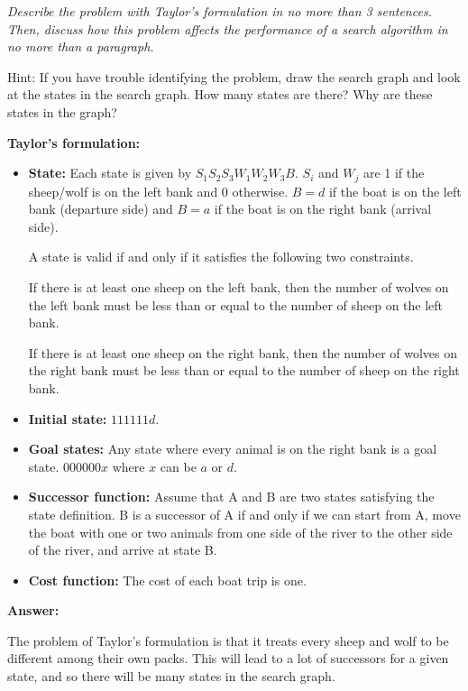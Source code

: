 \documentclass[12pt]{article}
\begin{document}
\begin{enumerate}[(a)]
{\em Describe the problem with Taylor's formulation in no more than 3 sentences. Then, discuss how this problem affects the performance of a search algorithm in no more than a paragraph.}

Hint: If you have trouble identifying the problem, draw the search graph and look at the states in the search graph. How many states are there? Why are these states in the graph?

\begin{example}

{\bf Taylor's formulation:}
\begin{itemize}
\item
{\bf State:} Each state is given by $S_1 S_2 S_3 W_1 W_2 W_3 B$. $S_i$ and $W_j$ are 1 if the sheep/wolf is on the left bank and 0 otherwise. $B = d$ if the boat is on the left bank (departure side) and $B = a$ if the boat is on the right bank (arrival side). 

A state is valid if and only if it satisfies the following two constraints.

If there is at least one sheep on the left bank, then the number of wolves on the left bank must be less than or equal to the number of sheep on the left bank. 

If there is at least one sheep on the right bank, then the number of wolves on the right bank must be less than or equal to the number of sheep on the right bank. 

\item
{\bf Initial state:} $111111d$.

\item
{\bf Goal states:} Any state where every animal is on the right bank is a goal state. $000000x$ where $x$ can be $a$ or $d$.

\item
{\bf Successor function:} Assume that A and B are two states satisfying the state definition. B is a successor of A if and only if we can start from A, move the boat with one or two animals from one side of the river to the other side of the river, and arrive at state B.

\item
{\bf Cost function:} The cost of each boat trip is one.
\end{itemize}

\end{example}

{\bf Answer:}

The problem of Taylor's formulation is that it treats every sheep and wolf to be different among their own packs. This will lead to a lot of successors for a given state, and so there will be many states in the search graph.


\end{enumerate}
\end{document}
